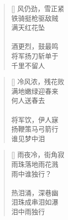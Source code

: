\renewcommand{\poemtoc}{section}
\settowidth{\versewidth}{风仍劲, 雪正紧}
\begin{verse}[\versewidth]
风仍劲，雪正紧\\
铁骑挺枪驱敌贼\\
满天红花坠\\
~\\
酒更烈，鼓最鸣\\
将军扬刀斩单于\\
千里不留人
\end{verse}

\renewcommand{\poemtoc}{section}
\settowidth{\versewidth}{风仍劲, 雪正紧}
\begin{verse}[\versewidth]
冷风浓，残花败\\
满地嫩绿迎春来\\
何人送春去\\
~\\
将军饮，伊人寐\\
扬鞭策马弓箭行\\
谁见梦中泪
\end{verse}

\renewcommand{\poemtoc}{section}
\settowidth{\versewidth}{风仍劲, 雪正紧}
\begin{verse}[\versewidth]
雨夜冷，街角寂\\
雨珠落地雨花溅\\
雨中谁独行？\\
~\\
热泪涌，深巷幽\\
泪珠成串泪如瀑\\
泪中雨独行
\end{verse}
